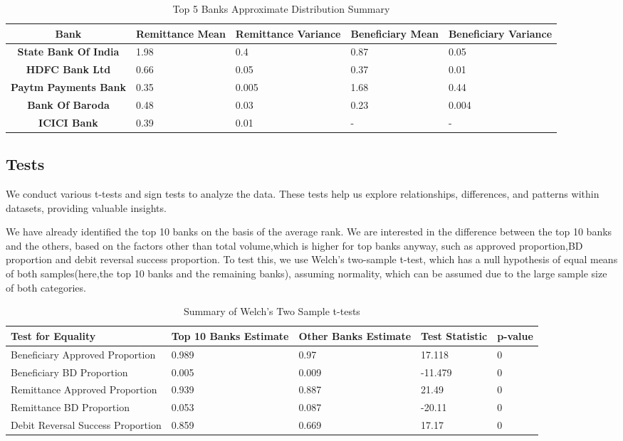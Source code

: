 \documentclass{article}
\begin{document}
\begin{table}[h]
    \centering
    \caption{Top 5 Banks Approximate Distribution Summary}
    \begin{tabular}{|c|p{2cm}|p{2cm}|p{2cm}|p{2cm}|}
        \hline
        \textbf{Bank} & \textbf{Remittance Mean} & \textbf{Remittance Variance} & \textbf{Beneficiary Mean} & \textbf{Beneficiary Variance} \\
        \hline
        \textbf{State Bank Of India} & 1.98 & 0.4 & 0.87 & 0.05 \\
        \textbf{HDFC Bank Ltd} & 0.66 & 0.05 & 0.37 & 0.01 \\
        \textbf{Paytm Payments Bank} & 0.35 & 0.005 & 1.68 & 0.44 \\
        \textbf{Bank Of Baroda} & 0.48 & 0.03 & 0.23 & 0.004 \\
        \textbf{ICICI Bank} & 0.39 & 0.01 & - & - \\
        \hline
    \end{tabular}
\end{table}



\subsection{Tests}

We conduct various t-tests and sign tests to analyze the data. These tests help us explore relationships, differences, and patterns within datasets, providing valuable insights.

We have already identified the top 10 banks on the basis of the average rank. We are interested in the difference between the top 10 banks and the others, based on the factors other than total volume,which is higher for top banks anyway, such as approved proportion,BD proportion and debit reversal success proportion. To test this, we use Welch's two-sample t-test, which has a null hypothesis of equal means of both samples(here,the top 10 banks and the remaining banks), assuming  normality, which can be assumed due to the large sample size of both categories.

\begin{table}[h]
\centering
\caption{Summary of Welch's Two Sample t-tests}
\begin{tabular}{|p{3cm}|p{2.5cm}|p{2.5cm}|p{2.5cm}|p{2cm}|}
\hline
\textbf{Test for Equality} & \textbf{Top 10 Banks Estimate} &\textbf{Other Banks Estimate} & \textbf{Test Statistic} & \textbf{p-value} \\
\hline
Beneficiary Approved Proportion & 0.989 & 0.97 & 17.118 & 0 \\
Beneficiary BD Proportion & 0.005 & 0.009 & -11.479 & 0 \\
Remittance Approved Proportion & 0.939 & 0.887 & 21.49 & 0 \\
Remittance BD Proportion & 0.053 & 0.087 & -20.11 & 0 \\
Debit Reversal Success Proportion & 0.859 & 0.669 & 17.17 & 0 \\
\hline
\end{tabular}
\label{tab:t_test_summary}
\end{table}
\end{document}

